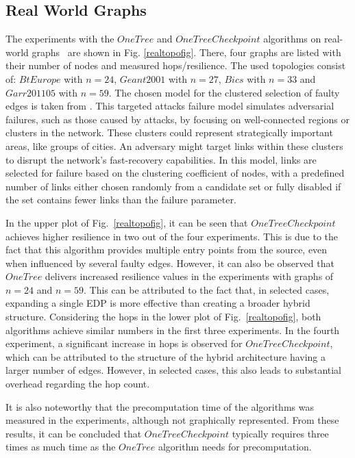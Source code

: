 \documentclass[conference]{IEEEtran}
\begin{document}
\subsection{Real World Graphs}
\label{realEval}
The experiments with the $OneTree$ and $OneTreeCheckpoint$ algorithms on real-world graphs~\cite{topologyZoo} are shown in Fig. \ref{realtopofig}. There, four graphs are listed with their number of nodes and measured hops/resilience. 
The used topologies consist of: $BtEurope$ with $n=24$, $Geant2001$ with $n=27$,  $Bics$ with $n=33$ and $Garr201105$ with $n=59$.
The chosen model for the clustered selection of faulty edges is taken from \cite{clusteredFailures}. 
This targeted attacks failure model simulates adversarial failures, such as those caused by attacks, by focusing on well-connected regions or clusters in the network. 
These clusters could represent strategically important areas, like groups of cities. 
An adversary might target links within these clusters to disrupt the network's fast-recovery capabilities.
In this model, links are selected for failure based on the clustering coefficient of nodes, with a predefined number of links either chosen randomly from a candidate set or fully disabled if the set contains fewer links than the failure parameter.

In the upper plot of Fig.~\ref{realtopofig}, it can be seen that $OneTreeCheckpoint$ achieves higher resilience in two out of the four experiments. This is due to the fact that this algorithm provides multiple entry points from the source, even when influenced by several faulty edges.
However, it can also be observed that $OneTree$ delivers increased resilience values in the experiments with graphs of $n=24$ and $n=59$. This can be attributed to the fact that, in selected cases, expanding a single EDP is more effective than creating a broader hybrid structure.
Considering the hops in the lower plot of Fig.~\ref{realtopofig}, both algorithms achieve similar numbers in the first three experiments. 
In the fourth experiment, a significant increase in hops is observed for $OneTreeCheckpoint$, which can be attributed to the structure of the hybrid architecture having a larger number of edges. However, in selected cases, this also leads to substantial overhead regarding the hop count.

It is also noteworthy that the precomputation time of the algorithms was measured in the experiments, although not graphically represented. From these results, it can be concluded that $OneTreeCheckpoint$ typically requires three times as much time as the $OneTree$ algorithm needs for precomputation.
\end{document}
